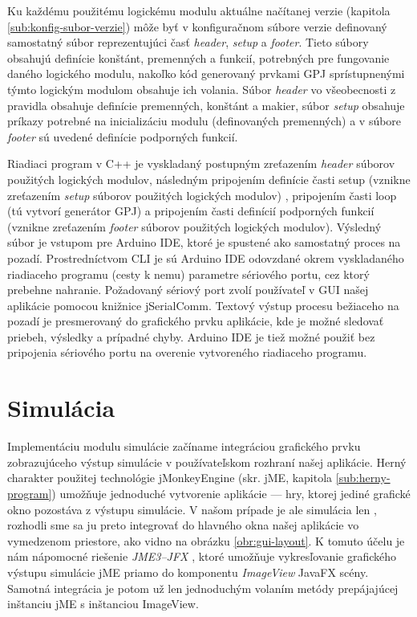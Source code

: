 Ku každému použitému logickému modulu aktuálne načítanej verzie (kapitola \ref{sub:konfig-subor-verzie}) môže byť v konfiguračnom súbore verzie definovaný samostatný súbor reprezentujúci časť \textit{header}, \textit{setup} a \textit{footer}.  Tieto súbory obsahujú definície konštánt, premenných a funkcií, potrebných pre fungovanie daného logického modulu, nakoľko kód generovaný prvkami GPJ sprístupnenými týmto logickým modulom obsahuje ich volania. Súbor \textit{header} vo všeobecnosti z pravidla obsahuje definície premenných, konštánt a makier, súbor \textit{setup} obsahuje príkazy potrebné na  inicializáciu modulu (definovaných premenných) a v súbore \textit{footer} sú uvedené definície podporných funkcií.

Riadiaci program v C++ je vyskladaný postupným zreťazením \textit{header} súborov použitých logických modulov, následným pripojením definície časti setup (vznikne zreťazením \textit{setup} súborov použitých logických modulov) , pripojením časti loop (tú vytvorí generátor GPJ) a pripojením časti definícií podporných funkcií (vznikne zreťazením \textit{footer} súborov použitých logických modulov). Výsledný súbor je vstupom pre Arduino IDE, ktoré je spustené ako samostatný proces na pozadí. Prostredníctvom CLI je sú Arduino IDE odovzdané okrem vyskladaného riadiaceho programu (cesty k nemu) parametre sériového portu, cez ktorý prebehne nahranie. Požadovaný sériový port zvolí používateľ v GUI našej aplikácie pomocou knižnice jSerialComm. Textový výstup procesu bežiaceho na pozadí je presmerovaný do grafického prvku aplikácie, kde je možné sledovať priebeh, výsledky a prípadné chyby. Arduino IDE je tiež možné použiť bez pripojenia sériového portu na overenie vytvoreného riadiaceho programu.


\section{Simulácia}
Implementáciu modulu simulácie začíname integráciou grafického prvku zobrazujúceho výstup simulácie v používateľskom rozhraní našej aplikácie. Herný charakter použitej technológie jMonkeyEngine (skr. jME, kapitola \ref{sub:herny-program}) umožňuje jednoduché vytvorenie aplikácie --- hry, ktorej jediné grafické okno pozostáva z výstupu simulácie. V našom prípade je ale simulácia len , rozhodli sme sa ju preto integrovať do hlavného okna našej aplikácie vo vymedzenom priestore, ako vidno na obrázku \ref{obr:gui-layout}. K tomuto účelu je nám nápomocné riešenie \textit{JME3--JFX} \cite{jmejfx}, ktoré umožňuje vykresľovanie grafického výstupu simulácie jME priamo do komponentu \textit{ImageView} JavaFX scény. Samotná integrácia je potom už len jednoduchým volaním metódy prepájajúcej inštanciu jME s inštanciou ImageView.

